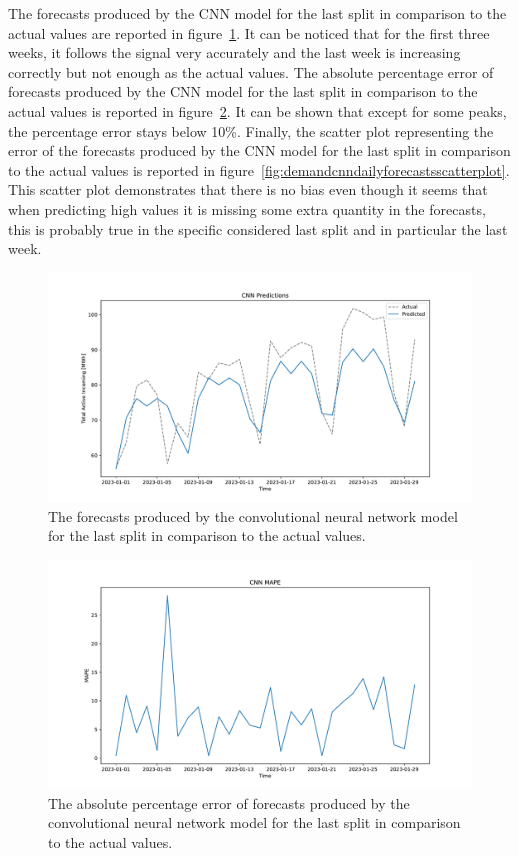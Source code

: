 The forecasts produced by the CNN model for the last split in comparison to the actual values are reported in figure~\ref{fig:demandcnndailyforecasts}.
It can be noticed that for the first three weeks, it follows the signal very accurately and the last week is increasing correctly but not enough as the actual values.
The absolute percentage error of forecasts produced by the CNN model for the last split in comparison to the actual values is reported in figure~\ref{fig:demandcnndailyforecastsmape}.
It can be shown that except for some peaks, the percentage error stays below 10\%.
Finally, the scatter plot representing the error of the forecasts produced by the CNN model for the last split in comparison to the actual values is reported in figure~\ref{fig:demandcnndailyforecastsscatterplot}.
This scatter plot demonstrates that there is no bias even though it seems that when predicting high values it is missing some extra quantity in the forecasts, this is probably true in the specific considered last split and in particular the last week.

\begin{figure}[H]
\centering
\includegraphics[width=1\textwidth]{images/demand/CNN_daily_aggregated}
\caption{The forecasts produced by the convolutional neural network model for the last split in comparison to the actual values.}
\label{fig:demandcnndailyforecasts}
\end{figure}

\begin{figure}[H]
\centering
\includegraphics[width=1\textwidth]{images/demand/CNN_daily_aggregated_mape}
\caption{The absolute percentage error of forecasts produced by the convolutional neural network model for the last split in comparison to the actual values.}
\label{fig:demandcnndailyforecastsmape}
\end{figure}

